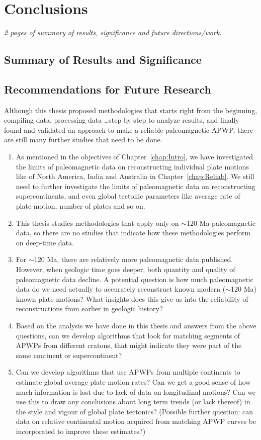 \chapter{Conclusions}\label{chap:Concl}
\textit{2 pages of summary of results, significance and future
directions/work.}
\vfill
\minitoc\newpage

\section{Summary of Results and Significance}

\section{Recommendations for Future Research}

Although this thesis proposed methodologies that starts right from the
beginning, compiling data, processing data \ldots step by step to analyze results,
and finally found and validated an approach to make a reliable paleomagnetic
APWP, there are still many further studies that need to be done.
%
\begin{enumerate}
  \item As mentioned in the objectives of Chapter~\ref{chap:Intro}, we have
  investigated the limits of paleomagnetic data on reconstructing individual
  plate motions like of North America, India and Australia in
  Chapter~\ref{chap:Reliab}. We still need to further investigate the limits of
  paleomagnetic data on reconstructing supercontinents, and even global tectonic
  parameters like average rate of plate motion, number of plates and so on.
  \item This thesis studies methodologies that apply only on
  $\sim$120 Ma paleomagnetic data, so there are no studies that
  indicate how these methodologies perform on deep-time data.
  \item For $\sim$120 Ma, there are relatively more paleomagnetic
  data published. However, when geologic time goes deeper, both quantity and
  quality of paleomagnetic data decline. A potential question is how much
  paleomagnetic data do we need actually to accurately reconstruct known modern
  ($\sim$120 Ma) known plate motions? What insights does this give
  us into the reliability of reconstructions from earlier in geologic history?
  \item Based on the analysis we have done in this thesis and answers from the
  above questions, can we develop algorithms that look for matching segments of
  APWPs from different cratons, that might indicate they were part of the same
  continent or supercontinent?
  \item Can we develop algorithms that use APWPs from multiple continents to
  estimate global average plate motion rates? Can we get a good sense of how
  much information is lost due to lack of data on longitudinal motions? Can we
  use this to draw any conclusions about long term trends (or lack thereof) in
  the style and vigour of global plate tectonics? (Possible further question:
  can data on relative continental motion acquired from matching APWP curves be
  incorporated to improve these estimates?)
\end{enumerate}
